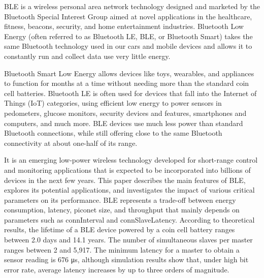 \documentclass[11pt,a4paper]{article}
\begin{document}
	 { BLE is a wireless personal area network technology designed and marketed by the Bluetooth Special Interest Group aimed at novel applications in the healthcare, fitness, beacons, security, and home entertainment industries. Bluetooth Low Energy (often referred to as Bluetooth LE, BLE, or Bluetooth Smart) takes the same Bluetooth technology used in our cars and mobile devices and allows it to constantly run and collect data use very little energy. 
	 
 Bluetooth Smart Low Energy allows devices like toys, wearables, and appliances to function for months at a time without needing more than the standard coin cell batteries. Bluetooth LE is often used for devices that fall into the Internet of Things (IoT) categories, using efficient low energy to power sensors in pedometers, glucose monitors, security devices and features, smartphones and computers, and much more. BLE devices use much less power than standard Bluetooth connections, while still offering close to the same Bluetooth connectivity at about one-half of its range. 
 
 It is an emerging low-power wireless technology developed for short-range control and monitoring applications that is expected to be incorporated into billions of devices in the next few years. This paper describes the main features of BLE, explores its potential applications, and investigates the impact of various critical parameters on its performance. BLE represents a trade-off between energy consumption, latency, piconet size, and throughput that mainly depends on parameters such as connInterval and connSlaveLatency. 
 According to theoretical results, the lifetime of a BLE device powered by a coin cell battery ranges between 2.0 days and 14.1 years. The number of simultaneous slaves per master ranges between 2
 and 5,917. The minimum latency for a master
 to obtain a sensor reading is 676 μs, although simulation results show that, under high bit error rate, average latency increases
 by up to three orders of magnitude.
 }
	 
	   \newpage
\end{document}

